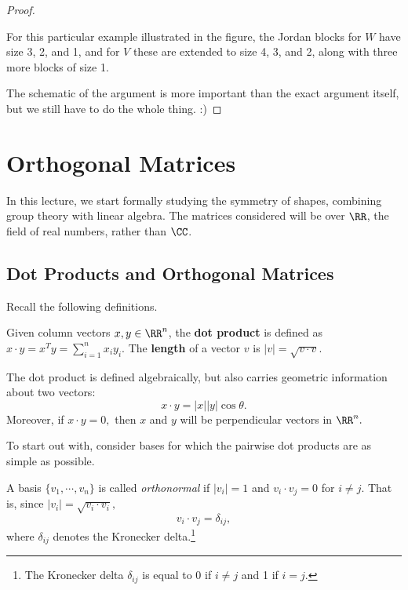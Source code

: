 \begin{proof}
\begin{itemize}
For this particular example illustrated in the figure, the Jordan blocks for $W$ have size 3, 2, and 1, and for $V$ these are extended to size 4, 3, and 2, along with three more blocks of size 1. 
\end{itemize}

The schematic of the argument is more important than the exact argument itself, but we still have to do the whole thing. :)

\end{proof}

\newpage


\section{Orthogonal Matrices}

In this lecture, we start formally studying the symmetry of shapes, combining group theory with linear algebra. The matrices considered will be over $\RR$, the field of real numbers, rather than $\CC$.

\subsection{Dot Products and Orthogonal Matrices}


Recall the following definitions.
\begin{definition}
    Given column vectors $x, y \in \RR^n$, the \textbf{dot product} is defined as $x \cdot y = x^T y = \sum_{i=1}^n x_i y_i$. The \textbf{length} of a vector $v$ is $|v| = \sqrt{v \cdot v}.$
\end{definition}

The dot product is defined algebraically, but also carries geometric information about two vectors: \[x \cdot y = |x||y|\cos\theta.\] Moreover, if $x \cdot y = 0,$ then $x$ and $y$ will be perpendicular vectors in $\RR^n.$

To start out with, consider bases for which the pairwise dot products are as simple as possible.
\begin{definition}
    A basis $\{v_1, \cdots, v_n\}$ is called \emph{orthonormal} if $|v_i| = 1$ and $v_i \cdot v_j = 0$ for $i \neq j.$ That is, since $|v_i| = \sqrt{v_i \cdot v_i},$ \[v_i \cdot v_j = \delta_{ij},\] where $\delta_{ij}$ denotes the Kronecker delta.\footnote{The Kronecker delta $\delta_{ij}$ is equal to 0 if $i \neq j$ and 1 if $i = j.$}
    
\end{definition}

